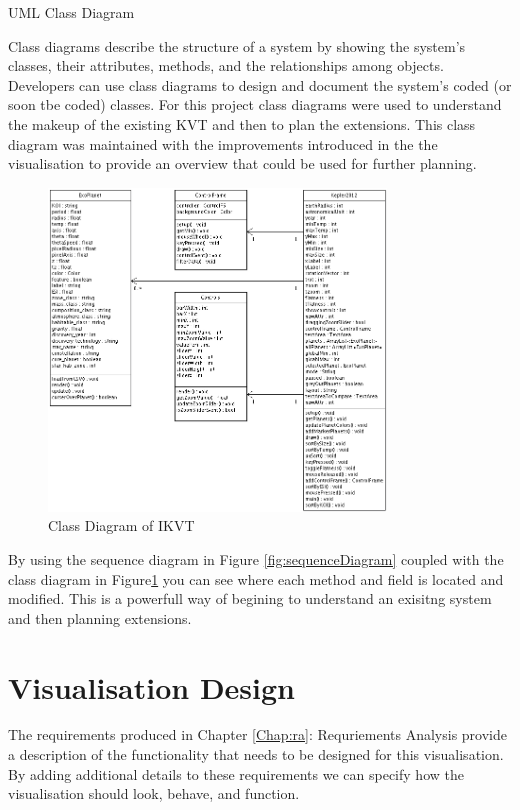 \begin{enumerate}
 {\bf \item UML Class Diagram}
 Class diagrams describe the structure of a system by showing the system's
classes, their attributes, methods, and the relationships among objects.
 Developers can use class diagrams to design and document the system's coded (or
soon tbe coded) classes. For this project class diagrams were used to understand
the makeup of the existing KVT and then to plan the extensions. This class
diagram was maintained with the improvements introduced in the the visualisation
to provide an overview that could be used for further planning.
 \begin{figure}[H]
  \centering
      \includegraphics[width=0.8\textwidth]{images/classDiagram.png}
  \caption{Class Diagram of IKVT}  
  \label{fig:classDiagram}
\end{figure}
\end{enumerate}

By using
the sequence diagram in Figure \ref{fig:sequenceDiagram} coupled with the class
diagram in Figure\ref{fig:classDiagram} you can see where each method and field
is located and modified. This is a powerfull way of begining to understand an
exisitng system and then planning extensions.

\section{Visualisation Design}
The requirements produced in Chapter \ref{Chap:ra}: Requriements Analysis
provide a
description of the functionality that needs to be designed for this
visualisation. By adding additional details to these requirements we can specify
how the visualisation should look, behave, and function.


